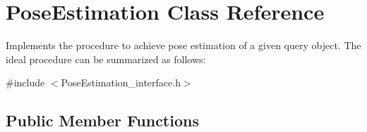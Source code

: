 \hypertarget{classPoseEstimation}{\section{Pose\-Estimation Class Reference}
\label{classPoseEstimation}
}


Implements the procedure to achieve pose estimation of a given query object. The ideal procedure can be summarized as follows\-:  




{\ttfamily \#include $<$Pose\-Estimation\-\_\-interface.\-h$>$}

\subsection*{Public Member Functions}
